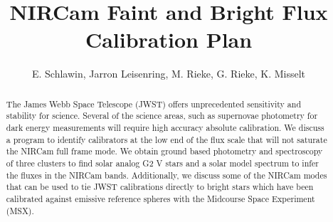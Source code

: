 \documentclass{aastex6}
\begin{document}

\title{NIRCam Faint and Bright Flux Calibration Plan}


\author{E. Schlawin, Jarron Leisenring, M. Rieke, G. Rieke, K. Misselt}




\begin{abstract}
The James Webb Space Telescope (JWST) offers unprecedented sensitivity and stability for science.
Several of the science areas, such as supernovae photometry for dark energy measurements will require high accuracy absolute calibration.
We discuss a program to identify calibrators at the low end of the flux scale that will not saturate the NIRCam full frame mode.
We obtain ground based photometry and spectroscopy of three clusters to find solar analog G2 V stars and a solar model spectrum to infer the fluxes in the NIRCam bands.
Additionally, we discuss some of the NIRCam modes that can be used to tie JWST calibrations directly to bright stars which have been calibrated against emissive reference spheres with the Midcourse Space Experiment (MSX).
\end{abstract}

\end{document}
